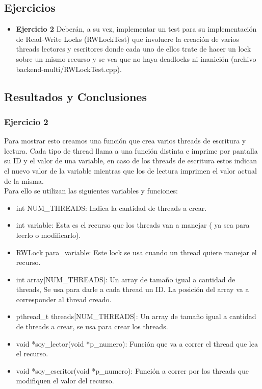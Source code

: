 
\subsection{Ejercicios}
\begin{itemize}
 \item 
\textbf{Ejercicio 2}
Deber\'{a}n, a su vez, implementar un test para su implementaci\'{o}n de Read-Write Locks (RWLockTest)
que involucre la creaci\'{o}n de varios threads lectores y escritores donde cada uno de ellos trate
de hacer un lock sobre un mismo recurso y se vea que no haya deadlocks ni inanici\'{o}n (archivo
backend-multi/RWLockTest.cpp).
\end{itemize}

\subsection{Resultados y Conclusiones}


\subsubsection[Resolución Ejercicio 2]{Ejercicio 2}

\indent Para mostrar esto creamos una funci\'{o}n que crea varios threads de escritura y lectura. Cada tipo de thread 
llama a una funci\'{o}n distinta e imprime por pantalla su ID y el valor de una variable, en caso de los threads de 
escritura estos indican el nuevo valor de la variable mientras que los de lectura imprimen el valor actual de la misma.\\
\indent Para ello se utilizan las siguientes variables y funciones:\\
\begin{itemize}
\item int NUM\_THREADS: Indica la cantidad de threads a crear.
\item int variable: Esta es el recurso que los threads van a manejar ( ya sea para leerlo o modificarlo).
\item RWLock para\_variable: Este lock se usa cuando un thread quiere manejar el recurso.
\item int array[NUM\_THREADS]: Un array de tama\~{n}o igual a cantidad de threads, Se usa para darle a cada thread un ID. 
La posici\'{o}n del array va a corresponder al thread creado.
\item pthread\_t threads[NUM\_THREADS]: Un array de tama\~{n}o igual a cantidad de threads a crear, se usa para crear los threads.
\item void *soy\_lector(void *p\_numero): Funci\'{o}n que va a correr el thread que lea el recurso.
\item void *soy\_escritor(void *p\_numero): Funci\'{o}n a correr por los threads que modifiquen el valor del recurso.
\end{itemize}

